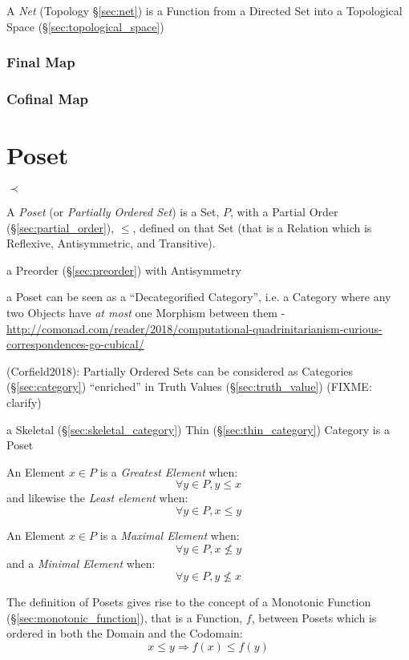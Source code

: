 \fist A \emph{Net} (Topology \S\ref{sec:net}) is a Function from a Directed Set
into a Topological Space (\S\ref{sec:topological_space})



\subsubsection{Final Map}\label{sec:final_map}

\subsubsection{Cofinal Map}\label{sec:cofinal_map}



\section{Poset}\label{sec:poset}

$\prec$

A \emph{Poset} (or \emph{Partially Ordered Set}) is a Set, $P$, with a
Partial Order (\S\ref{sec:partial_order}), $\leq$, defined on that
Set (that is a Relation which is Reflexive, Antisymmetric, and
Transitive).

a Preorder (\S\ref{sec:preorder}) with Antisymmetry

a Poset can be seen as a ``Decategorified Category'', i.e. a Category where any
two Objects have \emph{at most} one Morphism between them -
\url{http://comonad.com/reader/2018/computational-quadrinitarianism-curious-correspondences-go-cubical/}

(Corfield2018): Partially Ordered Sets can be considered as Categories
(\S\ref{sec:category}) ``enriched'' in Truth Values (\S\ref{sec:truth_value})
(FIXME: clarify)

a Skeletal (\S\ref{sec:skeletal_category}) Thin
(\S\ref{sec:thin_category}) Category is a Poset

An Element $x \in P$ is a \emph{Greatest Element} when:
\[
  \forall y \in P, y \leq x
\]
and likewise the \emph{Least element} when:
\[
  \forall y \in P, x \leq y
\]

An Element $x \in P$ is a \emph{Maximal Element} when:
\[
  \forall y \in P, x \nleq y
\]
and a \emph{Minimal Element} when:
\[
  \forall y \in P, y \nleq x
\]

The definition of Posets gives rise to the concept of a Monotonic
Function (\S\ref{sec:monotonic_function}), that is a Function, $f$,
between Posets which is ordered in both the Domain and the Codomain:
\[
  x \leq y \Rightarrow f(x) \leq f(y)
\]

